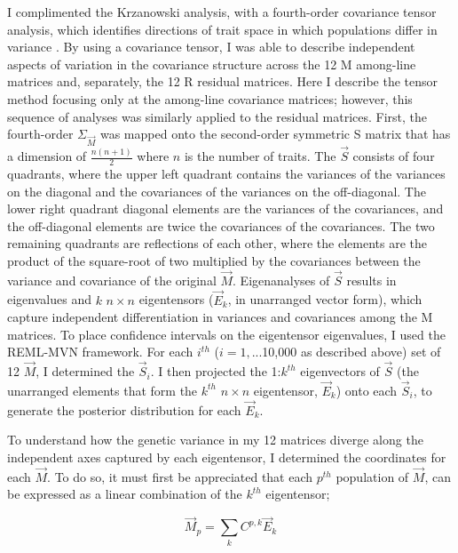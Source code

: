 I complimented the Krzanowski analysis, with a fourth-order covariance tensor analysis, which identifies directions of trait space in which populations differ in variance \citep{Hine09, Agui14}. By using a covariance tensor, I was able to describe independent aspects of variation in the covariance structure across the 12 M among-line matrices and, separately, the 12 R residual matrices. Here I describe the tensor method focusing only at the among-line covariance matrices; however, this sequence of analyses was similarly applied to the residual matrices. First, the fourth-order $\Sigma_{\vec{M}}$ was mapped onto the second-order symmetric S matrix that has a dimension of $\frac{n(n+1)}{2}$ where $n$ is the number of traits. The $\vec{S}$ consists of four quadrants, where the upper left quadrant contains the variances of the variances on the diagonal and the covariances of the variances on the off-diagonal. The lower right quadrant diagonal elements are the variances of the covariances, and the off-diagonal elements are twice the covariances of the covariances. The two remaining quadrants are reflections of each other, where the elements are the product of the square-root of two multiplied by the covariances between the variance and covariance of the original $\vec{M}$. Eigenanalyses of $\vec{S}$ results in eigenvalues and $k$ $n \times n$ eigentensors ($\vec{E}_k$, in unarranged vector form), which capture independent differentiation in variances and covariances among the M matrices. To place confidence intervals on the eigentensor eigenvalues, I used the REML-MVN framework. For each $i^{th}$ ($i=1,$...10,000 as described above) set of 12 $\vec{M}$, I determined the $\vec{S}_i$. I then projected the 1:$k^{th}$ eigenvectors of $\vec{S}$ (the unarranged elements that form the $k^{th}$ $n \times n$ eigentensor, $\vec{E}_k$) onto each $\vec{S}_i$, to generate the posterior distribution for each $\vec{E}_k$.\par

To understand how the genetic variance in my 12 matrices diverge along the independent axes captured by each eigentensor, I determined the coordinates for each $\vec{M}$. To do so, it must first be appreciated that each $p^{th}$ population of $\vec{M}$, can be expressed as a linear combination of the  $k^{th}$ eigentensor;\par

\vspace{-\parskip}
\begin{equation}
\vec{M}_p= \sum_{k}C^{p,k}\vec{E}_k \label{eqn:multi_3_cord}
\end{equation}


